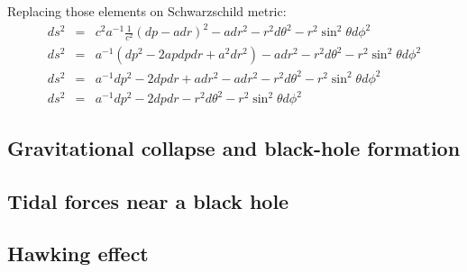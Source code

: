 \documentclass[letterpaper,11pt,onecolumn]{article}
\begin{document}
Replacing those elements on Schwarzschild metric:
\begin{eqnarray*}
    	ds^2 &=&c^2a^{-1}\frac{1}{c^2} (dp-adr)^2 - a dr^2 - r^2 d\theta^2 - r^2 \sin^2 \theta d\phi^2\\
    	ds^2 &=& a^{-1}(dp^2-2apdpdr+a^2dr^2) - a dr^2 - r^2 d\theta^2 - r^2 \sin^2 \theta d\phi^2\\
    	ds^2 &=& a^{-1}dp^2-2dpdr+adr^2- a dr^2 - r^2 d\theta^2 - r^2 \sin^2 \theta d\phi^2\\ 
    	ds^2 &=& a^{-1}dp^2-2dpdr-  r^2 d\theta^2 - r^2 \sin^2 \theta d\phi^2
\end{eqnarray*}






\subsection{Gravitational collapse and black-hole formation}

\subsection{Tidal forces near a black hole}

\subsection{Hawking effect}

\printbibliography
\end{document}
